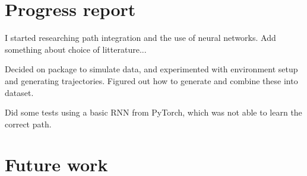 \section{Progress report}\label{sec:progress_report}
I started researching path integration and the use of neural networks. Add something about choice of litterature...

Decided on package to simulate data, and experimented with environment setup and generating trajectories. Figured out how to generate and combine these into dataset.

Did some tests using a basic RNN from PyTorch, which was not able to learn the correct path.

\section{Future work}\label{sec:future_work}
